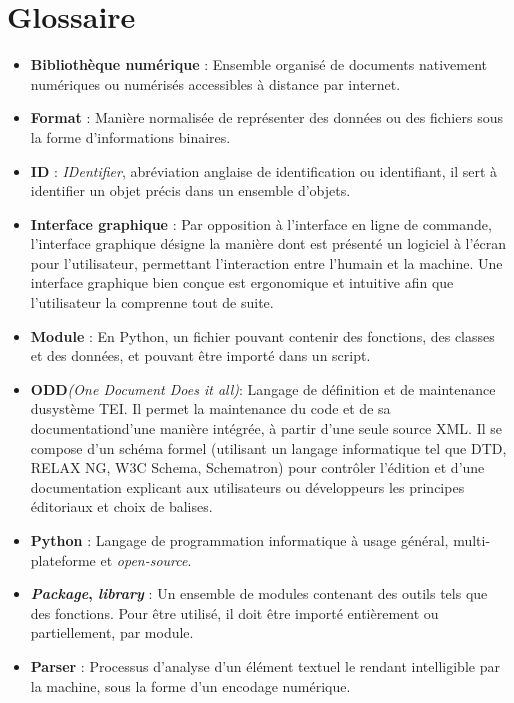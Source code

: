 \chapter*{Glossaire}
\pagestyle{myheadings}

\begin{itemize}
    \item \textbf{Bibliothèque numérique} : Ensemble organisé de documents nativement numériques ou numérisés accessibles à distance par internet.
    \item \textbf{Format} : Manière normalisée de représenter des données ou des fichiers sous la forme d'informations binaires.
    \item \textbf{ID} : \emph{IDentifier}, abréviation anglaise de identification ou identifiant, il sert à identifier un objet précis dans un ensemble d'objets.
    \item \textbf{Interface graphique} : Par opposition à l'interface en ligne de commande, l'interface graphique désigne la manière dont est présenté un logiciel à l'écran pour l'utilisateur, permettant l'interaction entre l'humain et la machine. Une interface graphique bien conçue est ergonomique et intuitive afin que l'utilisateur la comprenne tout de suite.
    \item \textbf{Module} : En Python, un fichier pouvant contenir des fonctions, des classes et des données, et pouvant être importé dans un script.
    \item{\textbf{ODD}\textit{(One Document Does it all)}}:  Langage de définition et de maintenance dusystème TEI. Il permet la maintenance du code et de sa documentationd’une manière intégrée, à partir d’une seule source XML. Il se compose d'un schéma formel (utilisant un langage informatique tel que DTD, RELAX NG, W3C Schema, Schematron) pour contrôler l’édition et d'une documentation explicant aux utilisateurs ou développeurs les principes éditoriaux et choix de balises.
    \item \textbf{Python} : Langage de programmation informatique à usage général, multi-plateforme et \emph{open-source}.
    \item \textbf{\emph{Package}, \emph{library}} : Un ensemble de modules contenant des outils tels que des fonctions. Pour être utilisé, il doit être importé entièrement ou partiellement, par module.
    \item \textbf{Parser} : Processus d'analyse d'un élément textuel le rendant intelligible par la machine, sous la forme d'un encodage numérique.

\end{itemize}
